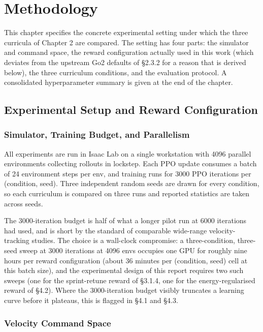 \section{Methodology}

This chapter specifies the concrete experimental setting under which the three curricula of Chapter 2 are compared. The setting has four parts: the simulator and command space, the reward configuration actually used in this work (which deviates from the upstream Go2 defaults of \S2.3.2 for a reason that is derived below), the three curriculum conditions, and the evaluation protocol. A consolidated hyperparameter summary is given at the end of the chapter.

\subsection{Experimental Setup and Reward Configuration}

\subsubsection{Simulator, Training Budget, and Parallelism}

All experiments are run in Isaac Lab on a single workstation with 4096 parallel environments collecting rollouts in lockstep. Each PPO update consumes a batch of 24 environment steps per env, and training runs for 3000 PPO iterations per (condition, seed). Three independent random seeds are drawn for every condition, so each curriculum is compared on three runs and reported statistics are taken across seeds.

The 3000-iteration budget is half of what a longer pilot run at 6000 iterations had used, and is short by the standard of comparable wide-range velocity-tracking studies. The choice is a wall-clock compromise: a three-condition, three-seed sweep at 3000 iterations at 4096 envs occupies one GPU for roughly nine hours per reward configuration (about 36 minutes per (condition, seed) cell at this batch size), and the experimental design of this report requires two such sweeps (one for the sprint-retune reward of \S3.1.4, one for the energy-regularised reward of \S4.2). Where the 3000-iteration budget visibly truncates a learning curve before it plateaus, this is flagged in \S4.1 and \S4.3.

\subsubsection{Velocity Command Space}

